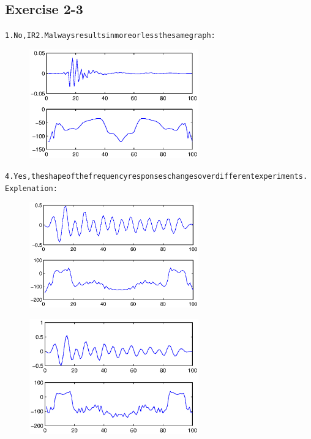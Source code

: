 \documentclass[a4paper,11pt]{article}
\begin{document}
\subsection{Exercise 2-3}
\begin{alltt}
1.	No, IR2.M always results in more or less thesame graph:
	\begin{figure}[h]
	  		\begin{center}
				\includegraphics[width=0.65\textwidth]{Sessie2/IR2.eps}
			\end{center}
			\label{benadering}
  	\end{figure}


4. Yes, the shape of the frequency responses changes over different experiments.
	Explenation:	
	\begin{figure}[H]
	  		\begin{center}
				\includegraphics[width=0.65\textwidth]{Sessie2/IRbs1.eps}
			\end{center}
			\label{benadering}
  	\end{figure}
  
  	
  	\begin{figure}[H]
	  		\begin{center}
				\includegraphics[width=0.65\textwidth]{Sessie2/IRbs2.eps}
			\end{center}
			\label{benadering}
  	\end{figure}
  

\end{alltt}
\end{document}
